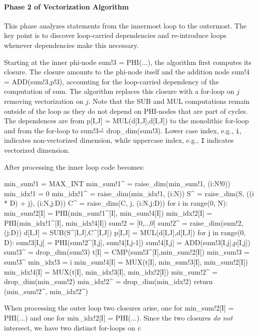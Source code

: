 \paragraph{Phase 2 of Vectorization Algorithm}

This phase analyzes statements from the innermost loop to the outermost. The key point is to discover loop-carried dependencies and re-introduce loops whenever dependencies make this necessary.

Starting at the inner phi-node {\sf sum!3 = PHI(...)}, the algorithm first computes its closure. The closure amounts to the phi-node itself and the addition node {\sf sum!4 = ADD(sum!3,p!3)}, accounting for the loop-carried dependency of the computation of {\sf sum}. The algorithm replaces this closure with a for-loop on $j$ removing vectorization on $j$. Note that the SUB and MUL computations remain outside of the loop as they do not depend on PHI-nodes that are part of cycles. The dependences are from {\sf p[I,J] = MUL(d[I,J],d[I,J])} to the monolithic for-loop and from the for-loop to {\sf sum!3\^ = drop\_dim(sum!3)}. Lower case index, e.g., \texttt{i}, indicates non-vectorized dimension, while uppercase index, e.g., \texttt{I} indicates vectorized dimension.

After processing the inner loop code becomes:

{\small
\begin{pythonn}
min_sum!1 = MAX_INT
min_sum!1^ = raise_dim(min_sum!1, (i:N!0))
min_idx!1 = 0
min_idx!1^ = raise_dim(min_idx!1, (i:N))
S^ = raise_dim(S, ((i * D) + j), (i:N,j:D))
C^ = raise_dim(C, j, (i:N,j:D))
for i in range(0, N):
  min_sum!2[I] = PHI(min_sum!1^[I], min_sum!4[I]) 
  min_idx!2[I] = PHI(min_idx!1^[I], min_idx!4[I])  
  sum!2 = [0,..,0] 
  sum!2^ = raise_dim(sum!2, (j:D))
  d[I,J] = SUB(S^[I,J],C^[I,J])
  p[I,J] = MUL(d[I,J],d[I,J])
  for j in range(0, D):
    sum!3[I,j] = PHI(sum!2^[I,j], sum!4[I,j-1])       
    sum!4[I,j] = ADD(sum!3[I,j],p[I,j])
  sum!3^ = drop_dim(sum!3)     
  t[I] = CMP(sum!3^[I],min_sum!2[I])
  min_sum!3 = sum!3^
  min_idx!3 = i
  min_sum!4[I] = MUX(t[I], min_sum!3[I], min_sum!2[I])
  min_idx!4[I] = MUX(t[I], min_idx!3[I], min_idx!2[I])
min_sum!2^ = drop_dim(min_sum!2)
min_idx!2^ = drop_dim(min_idx!2)   
return (min_sum!2^, min_idx!2^)
\end{pythonn}
}

When processing the outer loop two closures arise, one for {\sf min\_sum!2[I] = PHI(...)} and one 
for {\sf min\_idx!2[I] = PHI(...)}. Since the two closures \emph{do not} intersect, we have two distinct for-loops on $i$:


